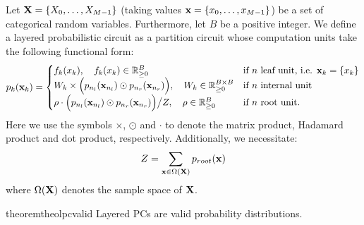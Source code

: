 \begin{definition}
	\label{def:lpc}
	Let $\mathbf{X}=\{X_0,\dots ,X_{M-1}  \}$ (taking values  $\mathbf{x}=\{x_0,\dots ,x_{M-1}  \}$) be a set of categorical random variables. Furthermore, let $B$ be a positive integer.
	We define a layered probabilistic circuit as a partition circuit whose computation units take the following functional form:
	\begin{align}
		{\circuit}_k(\xvars_k)=
		\begin{cases}
			f_k(\xvar_k),
			\quad f_k(\xvar_k) \in \mathbb{R}_{\geq 0}^B
			 & \text{if $n$ leaf unit, \ie $\xvars_k = \{\xvar_k \}$}
			\\
			W_k \times \Bigl( \circuit_{n_l}(\xvars_{n_l}) \odot  \circuit_{n_r} (\xvars_{n_r}) \Bigr),
			\quad W_k \in \mathbb{R}_{\geq 0}^{B \times B}
			 & \text{if $n$ internal unit}
			\\
			\rho \cdot \Bigl( \circuit_{n_l}(\xvars_{n_l}) \odot  \circuit_{n_r} (\xvars_{n_r}) \Bigr) \big/ Z,
			\quad \rho \in \mathbb{R}_{\geq 0}^{B}
			 & \text{if $n$ root unit.}
		\end{cases}
	\end{align}
	Here we use the symbols $\times$, $\odot$ and $\cdot$ to denote the matrix product, Hadamard product and dot product, respectively.
	Additionally, we necessitate:
	\begin{align}
		Z
		=
		\sum_{\mathbf{x} \in \Omega(\mathbf{X})}
		p_{root}(\mathbf{x})
	\end{align}
	where $\Omega(\mathbf{X})$ denotes the sample space of $\mathbf{X}$.
\end{definition}



\begin{restatable}{theorem}{theolpcvalid}
	\label{theo:lpcvalid}
	Layered PCs are valid probability distributions.
\end{restatable}

